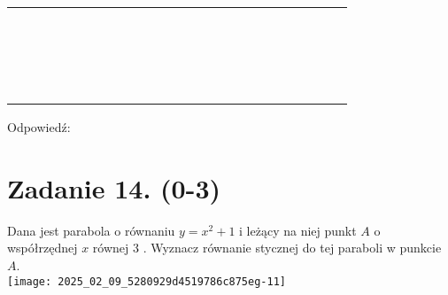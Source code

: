 \documentclass[10pt]{article}
\begin{document}
\begin{center}
\begin{tabular}{|c|c|c|c|c|c|c|c|c|c|c|c|c|c|c|c|c|c|c|c|c|c|c|c|}
\hline
 &  &  &  &  &  &  &  &  &  &  &  &  &  &  &  &  &  &  &  &  &  &  &  \\
\hline
 &  &  &  &  &  &  &  &  &  &  &  &  &  &  &  &  &  &  &  &  &  &  &  \\
\hline
 &  &  &  &  &  &  &  &  &  &  &  &  &  &  &  &  &  &  &  &  &  &  &  \\
\hline
 &  &  &  &  &  &  &  &  &  &  &  &  &  &  &  &  &  &  &  &  &  &  &  \\
\hline
 &  &  &  &  &  &  &  &  &  &  &  &  &  &  &  &  &  &  &  &  &  &  &  \\
\hline
 &  &  &  &  &  &  &  &  &  &  &  &  &  &  &  &  &  &  &  &  &  &  &  \\
\hline
 &  &  &  &  &  &  &  &  &  &  &  &  &  &  &  &  &  &  &  &  &  &  &  \\
\hline
 &  &  &  &  &  &  &  &  &  &  &  &  &  &  &  &  &  &  &  &  &  &  &  \\
\hline
 &  &  &  &  &  &  &  &  &  &  &  &  &  &  &  &  &  &  &  &  &  &  &  \\
\hline
 &  &  &  &  &  &  &  &  &  &  &  &  &  &  &  &  &  &  &  &  &  &  &  \\
\hline
 &  &  &  &  &  &  &  &  &  &  &  &  &  &  &  &  &  &  &  &  &  &  &  \\
\hline
 &  &  &  &  &  &  &  &  &  &  &  &  &  &  &  &  &  &  &  &  &  &  &  \\
\hline
 &  &  &  &  &  &  &  &  &  &  &  &  &  &  &  &  &  &  &  &  &  &  &  \\
\hline
 &  &  &  &  &  &  &  &  &  &  &  &  &  &  &  &  &  &  &  &  &  &  &  \\
\hline
 &  &  &  &  &  &  &  &  &  &  &  &  &  &  &  &  &  &  &  &  &  &  &  \\
\hline
 &  &  &  &  &  &  &  &  &  &  &  &  &  &  &  &  &  &  &  &  &  &  &  \\
\hline
 &  &  &  &  &  &  &  &  &  &  &  &  &  &  &  &  &  &  &  &  &  &  &  \\
\hline
 &  &  &  &  &  &  &  &  &  &  &  &  &  &  &  &  &  &  &  &  &  &  &  \\
\hline
 &  &  &  &  &  &  &  &  &  &  &  &  &  &  &  &  &  &  &  &  &  &  &  \\
\hline
\end{tabular}
\end{center}

Odpowiedź:

\section*{Zadanie 14. (0-3)}
Dana jest parabola o równaniu \(y=x^{2}+1\) i leżący na niej punkt \(A\) o współrzędnej \(x\) równej 3 . Wyznacz równanie stycznej do tej paraboli w punkcie \(A\).\\
\texttt{[image: 2025\_02\_09\_5280929d4519786c875eg-11]}
\end{document}
